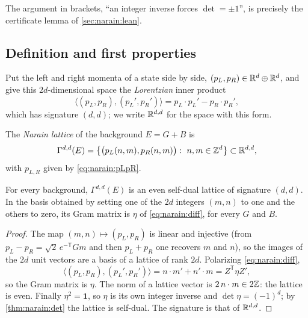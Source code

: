The argument in brackets, ``an integer inverse forces $\det=\pm1$'', is precisely the
certificate lemma  of \cref{sec:narain:lean}.

\subsection{Definition and first properties}

Put the left and right momenta of a state side by side, $(p_L,p_R)\in\mathbb{R}^d\oplus\mathbb{R}^d$, and give
this $2d$-dimensional space the \emph{Lorentzian} inner product
\begin{equation}\label{eq:narain:lorentz}
 \big\langle(p_L,p_R),(p_L',p_R')\big\rangle=p_L\cdot p_L'-p_R\cdot p_R' ,
\end{equation}
which has signature $(d,d)$; we write $\mathbb{R}^{d,d}$ for the space with this form.

\begin{definition}\label{def:narain:narain}
The \emph{Narain lattice} of the background $E=G+B$ is
\[
 \Gamma^{d,d}(E)=\big\{\big(p_L(n,m),p_R(n,m)\big):\ n,m\in\Z^d\big\}\subset\R^{d,d},
\]
with $p_{L,R}$ given by \eqref{eq:narain:pLpR}.
\end{definition}

\begin{theorem}\label{thm:narain:evenselfdual}
For every background, $\Gamma^{d,d}(E)$ is an even self-dual lattice of signature $(d,d)$.
In the basis obtained by setting one of the $2d$ integers $(m,n)$ to one and the others to
zero, its Gram matrix is $\eta$ of \eqref{eq:narain:diff}, for every $G$ and $B$.
\end{theorem}

\begin{proof}
The map $(m,n)\mapsto(p_L,p_R)$ is linear and injective (from $p_L-p_R=\sqrt2\,e^{-\mathsf T}Gm$
and then $p_L+p_R$ one recovers $m$ and $n$), so the images of the $2d$ unit vectors are a
basis of a lattice of rank $2d$. Polarizing \eqref{eq:narain:diff},
\begin{equation}\label{eq:narain:pairing}
 \big\langle(p_L,p_R),(p_L',p_R')\big\rangle=n\cdot m'+n'\cdot m=Z^{\mathsf T}\eta Z',
\end{equation}
so the Gram matrix is $\eta$. The norm of a lattice vector is $2\,n\cdot m\in2\mathbb{Z}$: the lattice
is even. Finally $\eta^2=\mathbf 1$, so $\eta$ is its own integer inverse and
$\det\eta=(-1)^d$; by \cref{thm:narain:det} the lattice is self-dual. The signature is that
of $\mathbb{R}^{d,d}$.
\end{proof}

